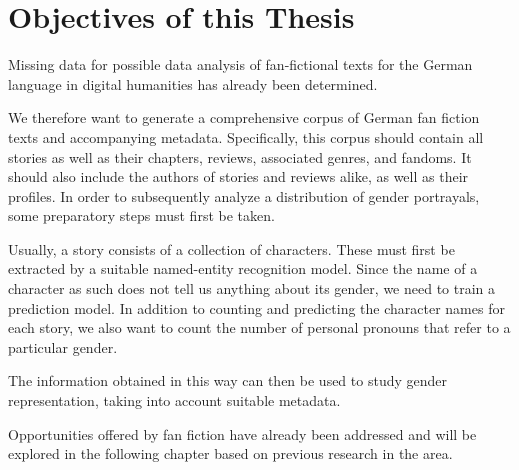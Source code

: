 
\chapter{Objectives of this Thesis}\label{ch:thesis-overview}

Missing data for possible data analysis of fan-fictional texts for the German language in digital humanities has already been determined.

We therefore want to generate a comprehensive corpus of German fan fiction texts and accompanying metadata.
Specifically, this corpus should contain all stories as well as their chapters, reviews, associated genres, and fandoms.
It should also include the authors of stories and reviews alike, as well as their profiles.
In order to subsequently analyze a distribution of gender portrayals, some preparatory steps must first be taken.

Usually, a story consists of a collection of characters.
These must first be extracted by a suitable named-entity recognition model.
Since the name of a character as such does not tell us anything about its gender, we need to train a prediction model.
In addition to counting and predicting the character names for each story, we also want to count the number of personal pronouns that refer to a particular gender.

The information obtained in this way can then be used to study gender representation, taking into account suitable metadata.

Opportunities offered by fan fiction have already been addressed and will be explored in the following chapter based on previous research in the area.